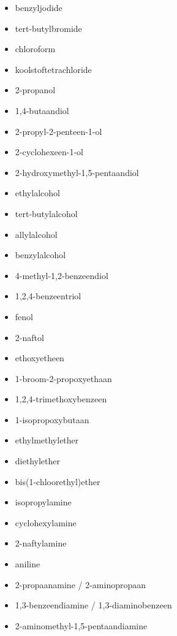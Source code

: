 \documentclass[a4paper,12pt]{article}
\begin{document}
\begin{enumerate}
\begin{enumerate}
\begin{itemize}
                    \item benzyljodide
                    \item tert-butylbromide
                    \item chloroform
                    \item koolstoftetrachloride
                    \item 2-propanol
                    \item 1,4-butaandiol
                    \item 2-propyl-2-penteen-1-ol
                    \item 2-cyclohexeen-1-ol
                    \item 2-hydroxymethyl-1,5-pentaandiol
                    \item ethylalcohol
                    \item tert-butylalcohol
                    \item allylalcohol
                    \item benzylalcohol
                    \item 4-methyl-1,2-benzeendiol
                    \item 1,2,4-benzeentriol
                    \item fenol
                    \item 2-naftol
                    \item ethoxyetheen
                    \item 1-broom-2-propoxyethaan
                    \item 1,2,4-trimethoxybenzeen
                    \item 1-isopropoxybutaan
                    \item ethylmethylether
                    \item diethylether
                    \item bis(1-chloorethyl)ether
                    \item isopropylamine
                    \item cyclohexylamine
                    \item 2-naftylamine
                    \item aniline
                    \item 2-propaanamine / 2-aminopropaan
                    \item 1,3-benzeendiamine / 1,3-diaminobenzeen
                    \item 2-aminomethyl-1,5-pentaandiamine

\end{itemize}
\end{enumerate}
\end{enumerate}
\end{document}
